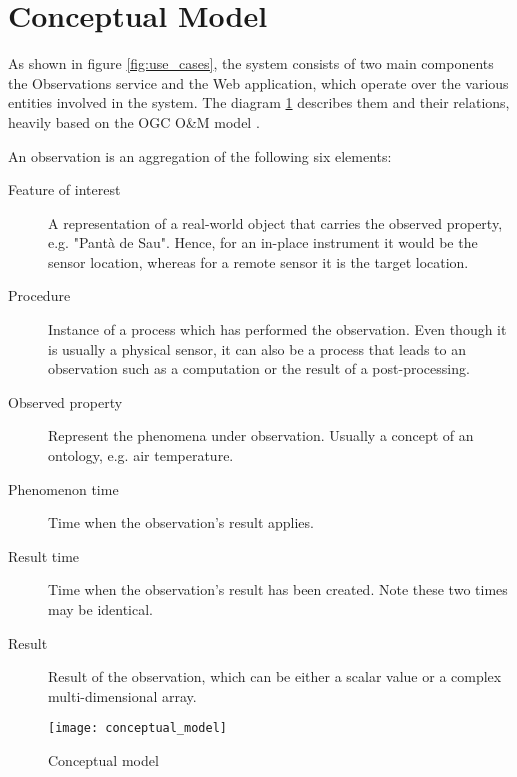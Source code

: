 \section{Conceptual Model}

As shown in figure \ref{fig:use_cases}, the system consists of two main components the Observations service and the Web application, which operate over the various entities involved in the system. The diagram \ref{fig:conceptual_model} describes them and their relations, heavily based on the OGC O\&M model \cite{OM}.

An observation is an aggregation of the following six elements:

\begin{description}
\item[Feature of interest] A representation of a real-world object that carries the observed property, e.g. "Pant\`a de Sau". Hence, for an in-place instrument it would be the sensor location, whereas for a remote sensor it is the target location.
\item[Procedure] Instance of a process which has performed the observation. Even though it is usually a physical sensor, it can also be a process that leads to an observation such as a computation or the result of a post-processing.
\item[Observed property] Represent the phenomena under observation. Usually a concept of an ontology, e.g. air temperature.
\item[Phenomenon time] Time when the observation's result applies.
\item[Result time] Time when the observation's result has been created. Note these two times may be identical.
\item[Result] Result of the observation, which can be either a scalar value or a complex multi-dimensional array.
\end{description}

\begin{figure}[h]
	\centering
	\texttt{[image: conceptual\_model]}
	\caption{Conceptual model}
	\label{fig:conceptual_model}
\end{figure}
